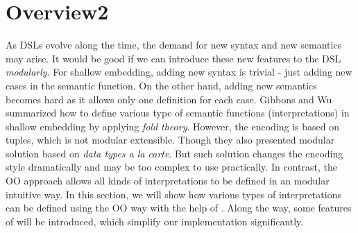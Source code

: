 \section{Overview2}

\begin{comment}
Weixin writes this one.

Go over jeremy's examples, maybe having only 3 diagram 
constructs instead of 5 for space reasons.

Use five constructs to show extensibility.

Think of how to introduce our tool? Using the Jeremy's examples? 
or introducing before with some other examples?

\end{comment}

As DSLs evolve along the time, the demand for new syntax and new semantics may arise.
It would be good if we can introduce these new features to the DSL \emph{modularly}.
For shallow embedding, adding new syntax is trivial - just adding new cases in
the semantic function. On the other hand, adding new semantics becomes hard as it allows
only one definition for each case. Gibbons and Wu summarized how to define
various type of semantic functions (interpretations) in shallow embedding by
applying \emph{fold theory}. However, the encoding is based on tuples, which is
not modular extensible. Though they also presented modular solution based on
\emph{data types a la carte}\cite{swierstra2008data}. But such solution changes the encoding style
dramatically and may be too complex to use practically.
In contrast, the OO approach allows all kinds of
interpretations to be defined in an modular intuitive way.
In this section, we will show how various types of interpretations can be
defined using the OO way with the help of \name. Along the way,
some features of \name will be introduced, which simplify our implementation significantly.


